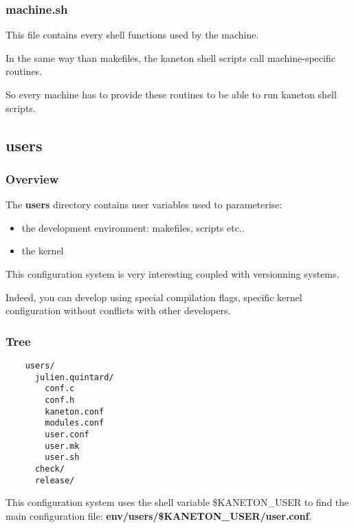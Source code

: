 
\begin{frame}
  \frametitle{machine.sh}

  This file contains every shell functions used by the machine.

  \nl

  In the same way than makefiles, the kaneton shell scripts call
  machine-specific routines.

  \nl

  So every machine has to provide these routines to be able to run
  kaneton shell scripts.
\end{frame}

%
%

\subsection{users}


\begin{frame}
  \frametitle{Overview}

  The \textbf{users} directory contains user variables used to parameterise:

  \begin{itemize}
    \item
      the development environment: makefiles, scripts etc..
    \item
      the kernel
  \end{itemize}

  \nl

  This configuration system is very interesting coupled with versionning
  systems.

  \nl

  Indeed, you can develop using special compilation flags, specific kernel
  configuration without conflicts with other developers.
\end{frame}


\begin{frame}[containsverbatim]
  \frametitle{Tree}

  \begin{verbatim}
    users/
      julien.quintard/
        conf.c
        conf.h
        kaneton.conf
        modules.conf
        user.conf
        user.mk
        user.sh
      check/
      release/
  \end{verbatim}

  This configuration system uses the shell variable \$KANETON\_USER to find
  the main configuration file: \textbf{env/users/\$KANETON\_USER/user.conf}.
\end{frame}

